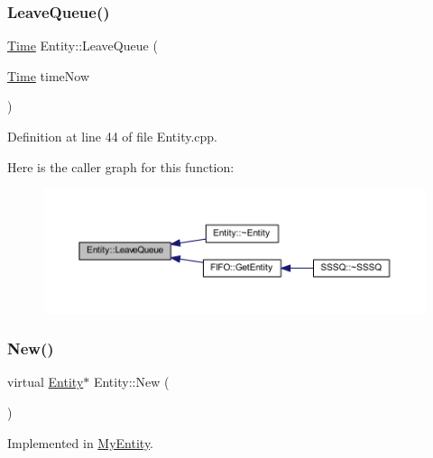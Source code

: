 \subsubsection{\texorpdfstring{Leave\+Queue()}{LeaveQueue()}}
{\footnotesize\ttfamily \hyperlink{_simulation_executive_8h_ac2d3e0ba793497bcca555c7c2cf64ff3}{Time} Entity\+::\+Leave\+Queue (\begin{DoxyParamCaption}\item[{\hyperlink{_simulation_executive_8h_ac2d3e0ba793497bcca555c7c2cf64ff3}{Time}}]{time\+Now }\end{DoxyParamCaption})}



Definition at line 44 of file Entity.\+cpp.

Here is the caller graph for this function\+:\nopagebreak
\begin{figure}[H]
\begin{center}
\leavevmode
\includegraphics[width=350pt]{class_entity_ae05b43362e61b48a4a2ec5f629730029_icgraph}
\end{center}
\end{figure}
\mbox{\label{class_entity_ab8dc894a31d5c72219fa070345d7c383}} 
\subsubsection{\texorpdfstring{New()}{New()}}
{\footnotesize\ttfamily virtual \hyperlink{class_entity}{Entity}$\ast$ Entity\+::\+New (\begin{DoxyParamCaption}{ }\end{DoxyParamCaption})\hspace{0.3cm}{\ttfamily [pure virtual]}}



Implemented in \hyperlink{class_my_entity_acc29e753a0df1928eb4c9e627d65a3b3}{My\+Entity}.


